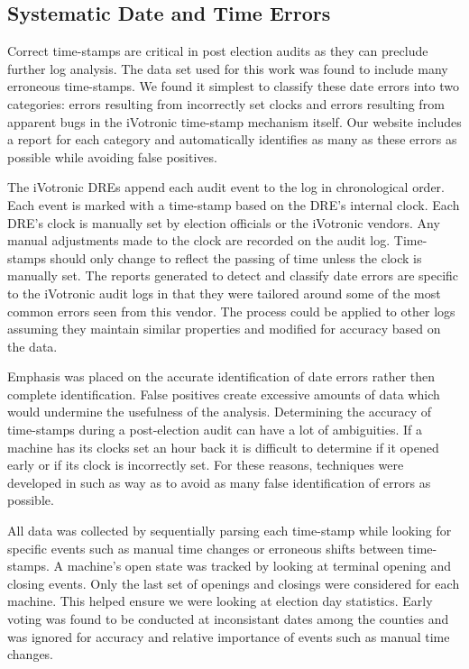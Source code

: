 \subsection{Systematic Date and Time Errors}\label{an:date} 
Correct time-stamps are critical in post election audits as they can preclude further log analysis. The data set used for this work was found to include many erroneous time-stamps. We found it simplest to classify these date errors into two categories: errors resulting from incorrectly set clocks and errors resulting from apparent bugs in the iVotronic time-stamp mechanism itself. Our website includes a report for each category and automatically identifies as many as these errors as possible while avoiding false positives.  

The iVotronic DREs append each audit event to the log in chronological order.  Each event is marked with a time-stamp based on the DRE's internal clock. Each DRE's clock is manually set by election officials or the iVotronic vendors. Any manual adjustments made to the clock are recorded on the audit log. Time-stamps should only change to reflect the passing of time unless the clock is manually set. The reports generated to detect and classify date errors are specific to the iVotronic audit logs in that they were tailored around some of the most common errors seen from this vendor.  The process could be applied to other logs assuming they maintain similar properties and modified for accuracy based on the data.  

Emphasis was placed on the accurate identification of date errors rather then complete identification. False positives create excessive amounts of data which would undermine the usefulness of the analysis. Determining the accuracy of time-stamps during a post-election audit can have a lot of ambiguities. If a machine has its clocks set an hour back it is difficult to determine if it opened early or if its clock is incorrectly set. For these reasons, techniques were developed in such as way as to avoid as many false identification of errors as possible.

All data was collected by sequentially parsing each time-stamp while looking for specific events such as manual time changes or erroneous shifts between time-stamps. A machine's open state was tracked by looking at terminal opening and closing events. Only the last set of openings and closings were considered for each machine. This helped ensure we were looking at election day statistics. Early voting was found to be conducted at inconsistant dates among the counties and was ignored for accuracy and relative importance of events such as manual time changes.


